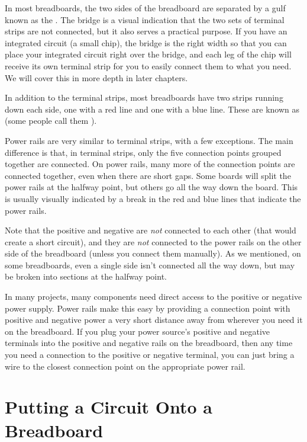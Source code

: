 In most breadboards, the two sides of the breadboard are separated by a gulf known as the .
The bridge is a visual indication that the two sets of terminal strips are not connected, but it also serves a practical purpose.
If you have an integrated circuit (a small chip), the bridge is the right width so that you can place your integrated circuit right over the bridge, and each leg of the chip will receive its own terminal strip for you to easily connect them to what you need.
We will cover this in more depth in later chapters.


In addition to the terminal strips, most breadboards have two strips running down each side, one with a red line and one with a blue line.
These are known as  (some people call them ).  

Power rails are very similar to terminal strips, with a few exceptions.
The main difference is that, in terminal strips, only the five connection points grouped together are connected.
On power rails, many more of the connection points are connected together, even when there are short gaps.
Some boards will split the power rails at the halfway point, but others go all the way down the board.  
This is usually visually indicated by a break in the red and blue lines that indicate the power rails.

Note that the positive and negative are \emph{not} connected to each other (that would create a short circuit), and they are \emph{not} connected to the power rails on the other side of the breadboard (unless you connect them manually).
As we mentioned, on some breadboards, even a single side isn't connected all the way down, but may be broken into sections at the halfway point.

In many projects, many components need direct access to the positive or negative power supply.
Power rails make this easy by providing a connection point with positive and negative power a very short distance away from wherever you need it on the breadboard.
If you plug your power source's positive and negative terminals into the positive and negative rails on the breadboard, then any time you need a connection to the positive or negative terminal, you can just bring a wire to the closest connection point on the appropriate power rail.

\section{Putting a Circuit Onto a Breadboard}

